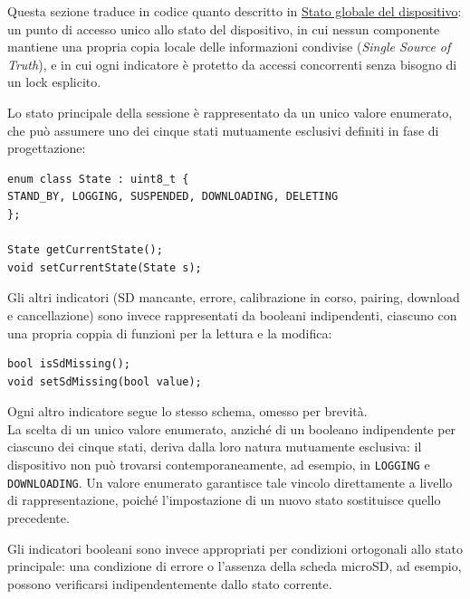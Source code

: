 Questa sezione traduce in codice quanto descritto in
\hyperref[sec:stato-globale]{Stato globale del dispositivo}: un punto di
accesso unico allo stato del dispositivo, in cui nessun componente mantiene
una propria copia locale delle informazioni condivise (\emph{Single Source of
Truth}), e in cui ogni indicatore è protetto da accessi concorrenti senza
bisogno di un lock esplicito.

Lo stato principale della sessione è rappresentato da un unico valore enumerato,
che può assumere uno dei cinque stati mutuamente esclusivi definiti in fase di
progettazione:

\begin{listing}[H]
\begin{verbatim}
enum class State : uint8_t {
STAND_BY, LOGGING, SUSPENDED, DOWNLOADING, DELETING
};

State getCurrentState();
void setCurrentState(State s);
\end{verbatim}
\caption{Stato principale di sessione}
\label{listing:session-state}
\end{listing}

Gli altri indicatori (SD mancante, errore, calibrazione in corso, pairing,
download e cancellazione) sono invece rappresentati da booleani indipendenti,
ciascuno con una propria coppia di funzioni per la lettura e la modifica:

\begin{listing}[H]
\begin{verbatim}
bool isSdMissing();
void setSdMissing(bool value);
\end{verbatim}
\caption{Interfaccia di un indicatore booleano indipendente}
\label{listing:global-state-indicator}
\end{listing}

Ogni altro indicatore segue lo stesso schema, omesso per brevità.\\

La scelta di un unico valore enumerato, anziché di un booleano indipendente per
ciascuno dei cinque stati, deriva dalla loro natura mutuamente esclusiva: il
dispositivo non può trovarsi contemporaneamente, ad esempio, in
\texttt{LOGGING} e \texttt{DOWNLOADING}. Un valore enumerato garantisce tale
vincolo direttamente a livello di rappresentazione, poiché l’impostazione di
un nuovo stato sostituisce quello precedente.

Gli indicatori booleani sono invece appropriati per condizioni ortogonali allo
stato principale: una condizione di errore o l’assenza della scheda microSD,
ad esempio, possono verificarsi indipendentemente dallo stato corrente.


